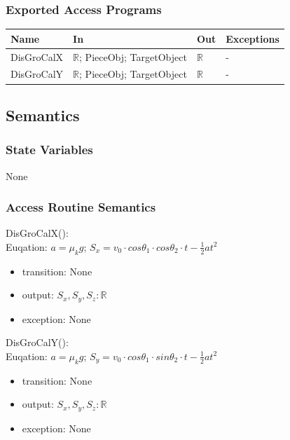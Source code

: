 \documentclass[12pt, titlepage]{article}
\begin{document}
\subsubsection{Exported Access Programs}

\begin{center}
	\begin{tabular}{p{2cm} p{4cm} p{4cm} p{2cm}}
		\hline
		\textbf{Name} & \textbf{In} & \textbf{Out} & \textbf{Exceptions} \\
		\hline
		DisGroCalX & $\mathbb{R}$; PieceObj; TargetObject & $\mathbb{R}$ & - \\
		DisGroCalY & $\mathbb{R}$; PieceObj; TargetObject & $\mathbb{R}$ & - \\
		\hline
	\end{tabular}
\end{center}

\subsection{Semantics}

\subsubsection{State Variables}

None

\subsubsection{Access Routine Semantics}

\noindent DisGroCalX():\\
Euqation: $a=\mu_{k}g$; $S_{x}=v_{0}\cdot cos\theta _{1}\cdot cos\theta _{2}\cdot t-\frac{1}{2}at^{2}$
\begin{itemize}
	\item transition: None
	\item output: $S_{x},S_{y},S_{z}: \mathbb{R}$ 
	\item exception: None 
\end{itemize}

\noindent DisGroCalY():\\
Euqation: $a=\mu_{k}g$; $S_{y}=v_{0}\cdot cos\theta _{1}\cdot sin\theta _{2}\cdot t-\frac{1}{2}at^{2}$
\begin{itemize}
	\item transition: None
	\item output: $S_{x},S_{y},S_{z}: \mathbb{R}$ 
	\item exception: None 
\end{itemize}
\end{document}
